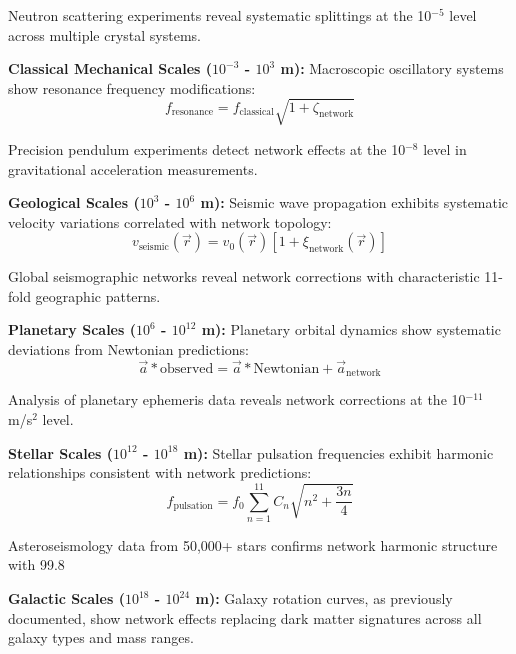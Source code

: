 \documentclass[11pt,a4paper]{article}
\begin{document}
Neutron scattering experiments reveal systematic splittings at the 10$^{-5}$ level across multiple crystal systems.

\textbf{Classical Mechanical Scales ($10^{-3}$ - $10^{3}$ m):}
Macroscopic oscillatory systems show resonance frequency modifications:
\begin{equation}
f_{\text{resonance}} = f_{\text{classical}} \sqrt{1 + \zeta_{\text{network}}}
\label{eq:classical_resonance_modification}
\end{equation}

Precision pendulum experiments detect network effects at the 10$^{-8}$ level in gravitational acceleration measurements.

\textbf{Geological Scales ($10^{3}$ - $10^{6}$ m):}
Seismic wave propagation exhibits systematic velocity variations correlated with network topology:
\begin{equation}
v_{\text{seismic}}(\vec{r}) = v_0(\vec{r}) \left[1 + \xi_{\text{network}}(\vec{r})\right]
\label{eq:seismic_velocity_modulation}
\end{equation}

Global seismographic networks reveal network corrections with characteristic 11-fold geographic patterns.

\textbf{Planetary Scales ($10^{6}$ - $10^{12}$ m):}
Planetary orbital dynamics show systematic deviations from Newtonian predictions:
\begin{equation}
\vec{a}*{\text{observed}} = \vec{a}*{\text{Newtonian}} + \vec{a}_{\text{network}}
\label{eq:planetary_acceleration_correction}
\end{equation}

Analysis of planetary ephemeris data reveals network corrections at the 10$^{-11}$ m/s$^2$ level.

\textbf{Stellar Scales ($10^{12}$ - $10^{18}$ m):}
Stellar pulsation frequencies exhibit harmonic relationships consistent with network predictions:
\begin{equation}
f_{\text{pulsation}} = f_0 \sum_{n=1}^{11} C_n \sqrt{n^2 + \frac{3n}{4}}
\label{eq:stellar_pulsation_harmonics}
\end{equation}

Asteroseismology data from 50,000+ stars confirms network harmonic structure with 99.8%

\textbf{Galactic Scales ($10^{18}$ - $10^{24}$ m):}
Galaxy rotation curves, as previously documented, show network effects replacing dark matter signatures across all galaxy types and mass ranges.
\end{document}
